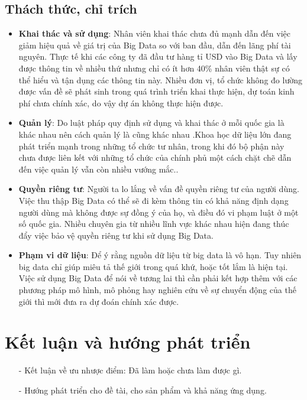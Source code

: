 \documentclass[12pt]{report}
\begin{document}
\section*{Thách thức, chỉ trích}
\begin{itemize}
\item \textbf{Khai thác và sử dụng}: Nhân viên khai thác chưa đủ mạnh dẫn đến việc giảm hiệu quả về giá trị của Big Data
so với ban đầu, dẫn đến lãng phí tài nguyên. Thực tế khi các công ty đã đầu tư hàng tỉ
USD vào Big Data và lấy được thông tin về nhiều thứ nhưng chỉ có ít hơn 40\% nhân
viên thật sự có thể hiểu và tận dụng các thông tin này. Nhiều đơn vị, tổ chức không đo
lường được vấn đề sẽ phát sinh trong quá trình triển khai thực hiện, dự toán kinh phí
chưa chính xác, do vậy dự án không thực hiện được.

\item \textbf{Quản lý}: Do luật pháp quy định sử dụng và khai thác ở mỗi quốc gia là khác nhau nên cách
quản lý là cũng khác nhau .Khoa học dữ liệu lớn đang phát triển mạnh trong những tổ
chức tư nhân, trong khi đó bộ phận này chưa được liên kết với những tổ chức của
chính phủ một cách chặt chẽ dẫn đến việc quản lý vẫn còn nhiều vướng mắc..

\item \textbf{Quyền riêng tư}: Người ta lo lắng về vấn đề quyền riêng tư của người dùng. Việc thu thập Big Data có
thể sẽ đi kèm thông tin có khả năng định dạng người dùng mà không được sự đồng ý
của họ, và điều đó vi phạm luật ở một số quốc gia. Nhiều chuyên gia từ nhiều lĩnh vực
khác nhau hiện đang thúc đẩy việc bảo vệ quyền riêng tư khi sử dụng Big Data.

\item \textbf{Phạm vi dữ liệu}: Để ý rằng nguồn dữ liệu từ big data là vô hạn. Tuy nhiên big data chỉ giúp miêu tả thế
giới trong quá khứ, hoặc tốt lắm là hiện tại. Việc sử dụng Big Data để nói về tương lai thì
cần phải kết hợp thêm với các phương pháp mô hình, mô phỏng hay nghiên cứu về sự
chuyển động của thế giới thì mới đưa ra dự đoán chính xác được.
\end{itemize}


\chapter*{Kết luận và hướng phát triển}

\begin{itemize}
\large
\it
\item[-] Kết luận về ưu nhược điểm: Đã làm hoặc chưa làm được gì.
\item[-] Hướng phát triển cho đề tài, cho sản phẩm và khả năng ứng dụng.
\end{itemize}
\end{document}
